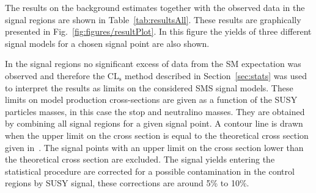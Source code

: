 The results on the background estimates together with the observed data in the signal regions are shown in Table~\ref{tab:resultsAll}. These results are graphically presented in Fig.~\ref{fig:figures/resultPlot}. In this figure the yields of three different signal models for a chosen signal point are also shown. 

In the signal regions no significant excess of data from the SM expectation was observed and therefore the $\mathrm{CL_{s}}$ method described in Section~\ref{sec:stats} was used to interpret the results as limits on the considered SMS signal models. These limits on model production cross-sections are given as a function of the SUSY particles masses, in this case the stop and neutralino masses. They are obtained by combining all signal regions for a given signal point. A contour line is drawn when the upper limit on the cross section is equal to the theoretical cross section given in~\cite{Borschensky:2014cia}. The signal points with an upper limit on the cross section lower than the theoretical cross section are excluded. The signal yields entering the statistical procedure are corrected for a possible contamination in the control regions by SUSY signal, these corrections are around 5\% to 10\%.

